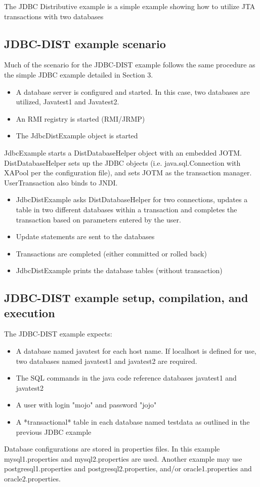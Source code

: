 \documentclass[a4paper,11pt]{article}
\begin{document}
The JDBC Distributive example is a simple example showing how to utilize
 JTA transactions with two databases

\subsection{JDBC-DIST example scenario}

Much of the scenario for the JDBC-DIST example follows the same procedure
 as the simple JDBC example detailed in Section 3.

\begin{itemize}
\item 	A database server is configured and started. In this case, 
two databases are utilized, Javatest1 and Javatest2.
\item An RMI registry is started (RMI/JRMP)
\item The JdbcDistExample object is started
\end{itemize}
\noindent JdbcExample starts a DistDatabaseHelper object with an embedded JOTM.
 DistDatabaseHelper sets up the JDBC objects (i.e. java.sql.Connection with
 XAPool per the configuration file), and sets JOTM as the transaction manager.
 UserTransaction also binds to JNDI.
\begin{itemize}
\item JdbcDistExample asks DistDatabaseHelper for two connections, updates
 a table in two different databases within a transaction and completes the
 transaction based on parameters entered by the user.
\item Update statements are sent to the databases
\item Transactions are completed (either committed or rolled back)
\item JdbcDistExample prints the database tables (without transaction)
\end{itemize}

\subsection{JDBC-DIST example setup, compilation, and execution}

The JDBC-DIST example expects:
\begin{itemize}
\item A database named javatest for each host name. If localhost is defined for use,
 two databases named javatest1 and javatest2 are required.
\item The SQL commands in the java code reference databases javatest1 and javatest2 
\item A user with login "mojo" and password "jojo"
\item A *transactional* table in each database named testdata as outlined in the
 previous JDBC example
\end{itemize}
\noindent Database configurations are stored in properties files.
 In this example mysql1.properties and mysql2.properties are used. Another
 example may use postgresql1.properties and postgresql2.properties, and/or
 oracle1.properties and oracle2.properties. 
\end{document}
